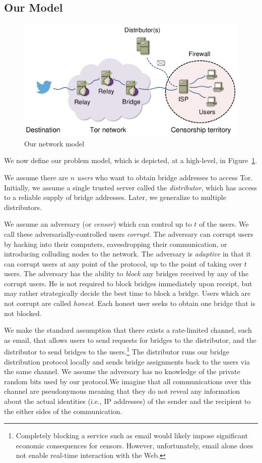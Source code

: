 \documentclass{llncs}
\newcommand{\fullpaper}[1]{#1}
\newcommand{\fullpaper}[1]{}
\newcommand{\jared}[1]{}
\newcommand{\sfsize}{\fontsize{0.73\baselineskip}{0.73\baselineskip}\selectfont}
\newcommand{\sans}[1]{\textsf{\sfsize \mbox{#1}}}
\newcommand{\sansb}[1]{\textbf{\sans{\mbox{#1}}}}
\newcommand{\para}[1]{\vspace{0.55em} \noindent \sansb{{\mbox{#1}}}}
\begin{document}
\subsection{Our Model} \label{sec:model}

\begin{figure}[t]
	\centering
	\includegraphics[width=0.64\linewidth]{images/model.pdf}
	\caption{Our network model}
	\label{fig:model}
\end{figure}

We now define our problem model, which is depicted, at a high-level, in Figure~\ref{fig:model}.


We assume there are $n$ \emph{users} who want to obtain bridge addresses to access Tor. Initially, we assume a single trusted server called the \emph{distributor}, which has access to a reliable supply of bridge addresses.  Later, we generalize to multiple distributors.

We assume an adversary (or \emph{censor}) which can control up to $t$ of the users.  We call these adversarially-controlled users \emph{corrupt}. \fullpaper{The adversary can corrupt users by hacking into their computers, eavesdropping their communication, or introducing colluding nodes to the network.}
The adversary is \emph{adaptive} in that it can corrupt users at any point of the protocol, up to the point of taking over $t$ users.  The adversary has the ability to \emph{block} any bridges received by any of the corrupt users.  He is not required to block bridges immediately upon receipt, but may rather strategically decide the best time to block a bridge.
Users which are not corrupt are called \emph{honest}. Each honest user seeks to obtain  one bridge that is not blocked.  

We make the standard assumption that there exists a rate-limited channel, such as email, that allows users to send requests for bridges to the distributor, and the distributor to send bridges to the users.\footnote{Completely blocking a service such as email would likely impose significant economic consequences for censors.  However, unfortunately, email alone does not enable real-time interaction with the Web.} The distributor runs our bridge distribution protocol locally and sends bridge assignments back to the users via the same channel. We assume the adversary has no knowledge of the private random bits used by our protocol.\fullpaper{We imagine that all communications over this channel are pseudonymous meaning that they do not reveal any information about the actual identities (i.e., IP addresses) of the sender and the recipient to the either sides of the communication.}
\end{document}
